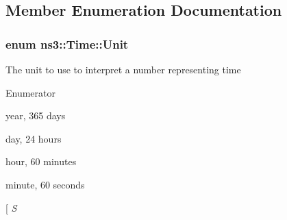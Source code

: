 \subsection{Member Enumeration Documentation}
\subsubsection[{\texorpdfstring{Unit}{Unit}}]{\setlength{\rightskip}{0pt plus 5cm}enum {\bf ns3\+::\+Time\+::\+Unit}}\hypertarget{classns3_1_1Time_a87a7f4d29c68b047a72d291ad660295a}{}\label{classns3_1_1Time_a87a7f4d29c68b047a72d291ad660295a}
The unit to use to interpret a number representing time \begin{Desc}
\item[Enumerator]\par
\begin{description}
\item[{\em 
Y\hypertarget{classns3_1_1Time_a87a7f4d29c68b047a72d291ad660295aa93b748b67f19962213e21351471b9894}{}\label{classns3_1_1Time_a87a7f4d29c68b047a72d291ad660295aa93b748b67f19962213e21351471b9894}
}]year, 365 days \item[{\em 
D\hypertarget{classns3_1_1Time_a87a7f4d29c68b047a72d291ad660295aa57d629936515b651f647fc7b9dbdd337}{}\label{classns3_1_1Time_a87a7f4d29c68b047a72d291ad660295aa57d629936515b651f647fc7b9dbdd337}
}]day, 24 hours \item[{\em 
H\hypertarget{classns3_1_1Time_a87a7f4d29c68b047a72d291ad660295aab086c75db915fe77224398f4def87de6}{}\label{classns3_1_1Time_a87a7f4d29c68b047a72d291ad660295aab086c75db915fe77224398f4def87de6}
}]hour, 60 minutes \item[{\em 
M\+IN\hypertarget{classns3_1_1Time_a87a7f4d29c68b047a72d291ad660295aabdaf8c3839253c104b01320f8a66475d}{}\label{classns3_1_1Time_a87a7f4d29c68b047a72d291ad660295aabdaf8c3839253c104b01320f8a66475d}
}]minute, 60 seconds \item[{\em 
S\hypertarget{classns3_1_1Time_a87a7f4d29c68b047a72d291ad660295aade8622b06524a328cd3a59db6ccf76af}{}\label{classns3_1_1Time_a87a7f4d29c68b047a72d291ad660295aade8622b06524a328cd3a59db6ccf76af}
}
\end{description}
\end{Desc}

